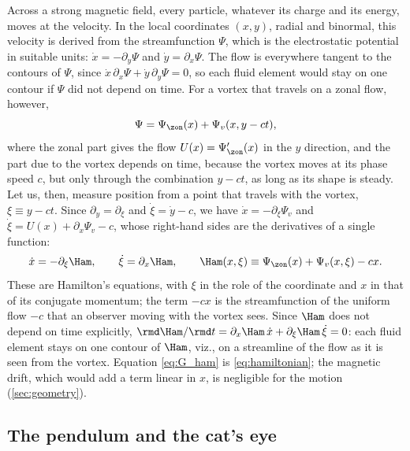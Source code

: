 Across a strong magnetic field, every particle, whatever its charge and its energy, moves at the \exb{} velocity. In the local coordinates \((x, y)\), radial and binormal, this velocity is derived from the streamfunction \(\Psi\), which is the electrostatic potential in suitable units: \(\dot x = -\partial_y\Psi\) and \(\dot y = \partial_x\Psi\). The flow is everywhere tangent to the contours of \(\Psi\), since \(\dot x\,\partial_x\Psi + \dot y\,\partial_y\Psi = 0\), so each fluid element would stay on one contour if \(\Psi\) did not depend on time. For a vortex that travels on a zonal flow, however,
\begin{equation}
\Psi = \Psi_\zon(x) + \Psi_v(x, y - ct),
\label{eq:G_psi}
\end{equation}
where the zonal part gives the flow \(U(x) = \Psi_\zon'(x)\) in the \(y\) direction, and the part due to the vortex depends on time, because the vortex moves at its phase speed \(c\), but only through the combination \(y - ct\), as long as its shape is steady. Let us, then, measure position from a point that travels with the vortex, \(\xi \equiv y - ct\). Since \(\partial_y = \partial_\xi\) and \(\dot\xi = \dot y - c\), we have \(\dot x = -\partial_\xi\Psi_v\) and \(\dot\xi = U(x) + \partial_x\Psi_v - c\), whose right-hand sides are the derivatives of a single function:
\begin{equation}
\dot x = -\partial_\xi\Ham,
\qquad
\dot\xi = \partial_x\Ham,
\qquad
\Ham(x, \xi) \equiv \Psi_\zon(x) + \Psi_v(x, \xi) - cx.
\label{eq:G_ham}
\end{equation}
These are Hamilton's equations, with \(\xi\) in the role of the coordinate and \(x\) in that of its conjugate momentum; the term \(-cx\) is the streamfunction of the uniform flow \(-c\) that an observer moving with the vortex sees. Since \(\Ham\) does not depend on time explicitly, \(\rmd\Ham/\rmd t = \partial_x\Ham\,\dot x + \partial_\xi\Ham\,\dot\xi = 0\): each fluid element stays on one contour of \(\Ham\), viz., on a streamline of the flow as it is seen from the vortex. Equation \cref{eq:G_ham} is \cref{eq:hamiltonian}; the magnetic drift, which would add a term linear in \(x\), is negligible for the motion (\cref{sec:geometry}).

\subsection{The pendulum and the cat's eye}\label{app:trapping_pendulum}


